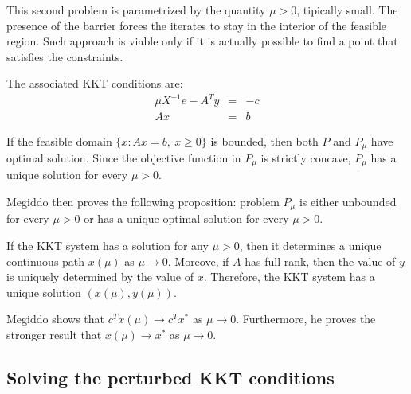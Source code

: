 This second problem is parametrized by the quantity $\mu > 0$, 
tipically small. The presence of the barrier forces the iterates 
to stay in the interior of the feasible region. Such approach is 
viable only if it is actually possible to find a point that 
satisfies the constraints.

The associated KKT conditions are:
\[
\begin{array}{lcc}
  \mu X^{-1}e -A^Ty & = & -c \\
   Ax               & = &  b
\end{array}
\]

If the feasible domain $\{ x: Ax=b,\: x\ge 0 \}$ is bounded, 
then both $P$ and $P_\mu$ have optimal solution. Since the 
objective function in $P_\mu$ is strictly concave, $P_\mu$ 
has a unique solution for every $\mu>0$.

Megiddo then proves the following proposition: problem $P_\mu$ 
is either unbounded for every  $\mu>0$ or has a unique optimal 
solution for every $\mu>0$.

If the KKT system has a solution for any $\mu>0$, then it 
determines a unique continuous path $x(\mu)$ as $\mu\to 0$. 
Moreove, if $A$ has full rank, then the value of $y$ is 
uniquely determined by the value of $x$. Therefore, the KKT 
system has a unique solution $(x(\mu),y(\mu))$.

Megiddo shows that $c^Tx(\mu)\to c^Tx^*$ as $\mu\to 0$. 
Furthermore, he proves the stronger result that 
$x(\mu)\to x^*$ as $\mu\to 0$.


%
%
\subsection{Solving the perturbed KKT conditions}

